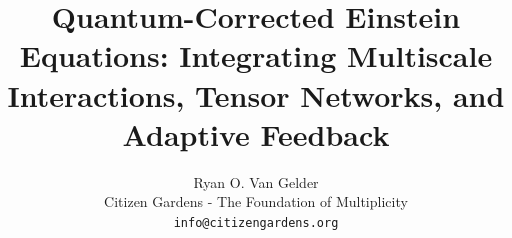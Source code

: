 \documentclass{article}
\title{Quantum-Corrected Einstein Equations: Integrating Multiscale Interactions, Tensor Networks, and Adaptive Feedback}
\author{Ryan O. Van Gelder \\
Citizen Gardens - The Foundation of Multiplicity \\
\texttt{info@citizengardens.org}}
\theoremstyle{plain}
\begin{document}
\maketitle


\nocite{*}


\end{document}
